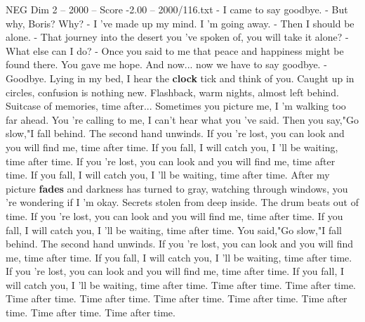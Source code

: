 \begin{textsample}{NEG Dim 2 – 2000 – Score -2.00 – 2000/116.txt}  \label{ex:f2_neg_037}
- I came to say goodbye. - But why, Boris?
Why? - I 've made up my mind.
I 'm going away. - Then I should be alone. - That journey into the desert you 've spoken of, you will take it alone? - What else can I do? - Once you said to me that peace and happiness might be found there.
You gave me hope.
And now... now we have to say goodbye. - Goodbye.
Lying in my bed, I hear the \textbf{clock} tick and think of you.
Caught up in circles, confusion is nothing new.
Flashback, warm nights, almost left behind.
Suitcase of memories, time after...
Sometimes you picture me, I 'm walking too far ahead.
You 're calling to me, I can't hear what you 've said.
Then you say,"Go slow,"I fall behind.
The second hand unwinds.
If you 're lost, you can look and you will find me, time after time.
If you fall, I will catch you, I 'll be waiting, time after time.
If you 're lost, you can look and you will find me, time after time.
If you fall, I will catch you, I 'll be waiting, time after time.
After my picture \textbf{fades} and darkness has turned to gray, watching through windows, you 're wondering if I 'm okay.
Secrets stolen from deep inside.
The drum beats out of time.
If you 're lost, you can look and you will find me, time after time.
If you fall, I will catch you, I 'll be waiting, time after time.
You said,"Go slow,"I fall behind.
The second hand unwinds.
If you 're lost, you can look and you will find me, time after time.
If you fall, I will catch you, I 'll be waiting, time after time.
If you 're lost, you can look and you will find me, time after time.
If you fall, I will catch you, I 'll be waiting, time after time.
Time after time.
Time after time.
Time after time.
Time after time.
Time after time.
Time after time.
Time after time.
Time after time.
Time after time.

\end{textsample}
